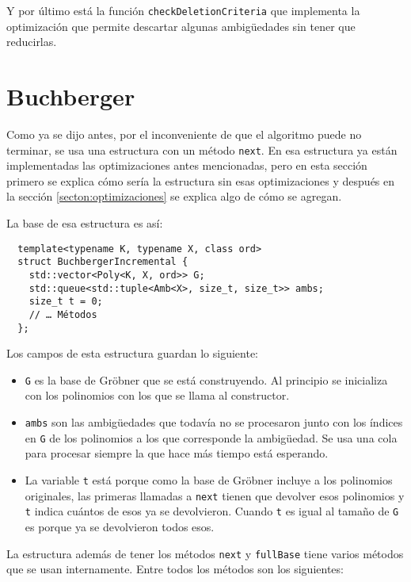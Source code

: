 \documentclass[12pt]{report}
\theoremstyle{customstyle}
\theoremstyle{factstyle}
\begin{document}
Y por último está la función \texttt{checkDeletionCriteria} que implementa la optimización que permite descartar algunas ambigüedades sin tener que reducirlas.

\section{Buchberger}

Como ya se dijo antes, por el inconveniente de que el algoritmo puede no terminar, se usa una estructura con un método \texttt{next}. En esa estructura ya están implementadas las optimizaciones antes mencionadas, pero en esta sección primero se explica cómo sería la estructura sin esas optimizaciones y después en la sección \cref{secton:optimizaciones} se explica algo de cómo se agregan.

La base de esa estructura es así:

\begin{verbatim}
  template<typename K, typename X, class ord>
  struct BuchbergerIncremental {
    std::vector<Poly<K, X, ord>> G;
    std::queue<std::tuple<Amb<X>, size_t, size_t>> ambs;
    size_t t = 0;
    // … Métodos
  };
\end{verbatim}

Los campos de esta estructura guardan lo siguiente:

\begin{itemize}
  \item \texttt{G} es la base de Gröbner que se está construyendo. Al principio se inicializa con los polinomios con los que se llama al constructor.
  \item \texttt{ambs} son las ambigüedades que todavía no se procesaron junto con los índices en \texttt{G} de los polinomios a los que corresponde la ambigüedad. Se usa una cola para procesar siempre la que hace más tiempo está esperando.
  \item La variable \texttt{t} está porque como la base de Gröbner incluye a los polinomios originales, las primeras llamadas a \texttt{next} tienen que devolver esos polinomios y \texttt{t} indica cuántos de esos ya se devolvieron. Cuando \texttt{t} es igual al tamaño de \texttt{G} es porque ya se devolvieron todos esos.
\end{itemize}

La estructura además de tener los métodos \texttt{next} y \texttt{fullBase} tiene varios métodos que se usan internamente. Entre todos los métodos son los siguientes: %
\end{document}
